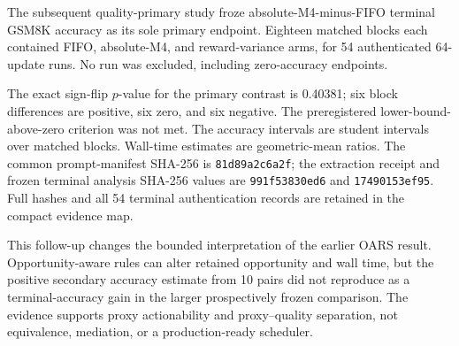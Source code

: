 \documentclass{article}
\begin{document}
The subsequent quality-primary study froze absolute-M4-minus-FIFO terminal GSM8K accuracy as its sole primary endpoint. Eighteen matched blocks each contained FIFO, absolute-M4, and reward-variance arms, for 54 authenticated 64-update runs. No run was excluded, including zero-accuracy endpoints.

\begin{table}[h]
\caption{Three-arm quality-primary follow-up.}
\centering\scriptsize
{}
\end{table}

The exact sign-flip $p$-value for the primary contrast is 0.40381; six block differences are positive, six zero, and six negative. The preregistered lower-bound-above-zero criterion was not met. The accuracy intervals are student intervals over matched blocks. Wall-time estimates are geometric-mean ratios. The common prompt-manifest SHA-256 is \texttt{81d89a2c6a2f}; the extraction receipt and frozen terminal analysis SHA-256 values are \texttt{991f53830ed6} and \texttt{17490153ef95}. Full hashes and all 54 terminal authentication records are retained in the compact evidence map.

This follow-up changes the bounded interpretation of the earlier OARS result. Opportunity-aware rules can alter retained opportunity and wall time, but the positive secondary accuracy estimate from 10 pairs did not reproduce as a terminal-accuracy gain in the larger prospectively frozen comparison. The evidence supports proxy actionability and proxy--quality separation, not equivalence, mediation, or a production-ready scheduler.
\end{document}

